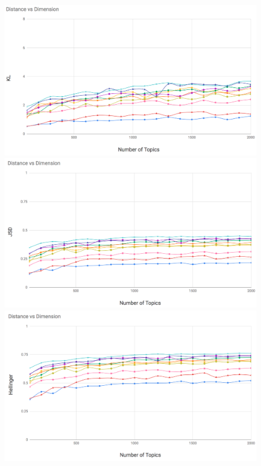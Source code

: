 \begin{figure}

\begin{adjustbox}{minipage=0.45\linewidth,frame=1pt 5pt}
\includegraphics[width=\linewidth]{KL_100_2k.png}
\end{adjustbox}
\hfill
\begin{adjustbox}{minipage=0.45\linewidth,frame=1pt 5pt}
\includegraphics[width=\linewidth]{JSD_100_2k.png}
\end{adjustbox}
\hfill
\begin{adjustbox}{minipage=0.45\linewidth,frame=1pt 5pt}
\includegraphics[width=\linewidth]{He_100_2k.png}

\end{adjustbox}
\end{figure}
